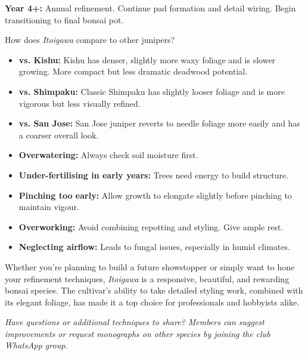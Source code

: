 \textbf{Year 4+:} Annual refinement.
Continue pad formation and detail wiring.
Begin transitioning to final bonsai pot.

\medskip
{}
\noindent
How does \textit{Itoigawa} compare to other junipers?

\begin{itemize}
    \item \textbf{vs. Kishu:} Kishu has denser, slightly more waxy foliage and is slower growing.
    More compact but less dramatic deadwood potential.

    \item \textbf{vs. Shimpaku:} Classic Shimpaku has slightly looser foliage and is more vigorous but less visually refined.

    \item \textbf{vs. San Jose:} San Jose juniper reverts to needle foliage more easily and has a coarser overall look.
\end{itemize}

\medskip
{}
\noindent
\begin{itemize}
    \item \textbf{Overwatering:} Always check soil moisture first.

    \item \textbf{Under\--fertilising in early years:} Trees need energy to build structure.

    \item \textbf{Pinching too early:} Allow growth to elongate slightly before pinching to maintain vigour.

    \item \textbf{Overworking:} Avoid combining repotting and styling.
    Give ample rest.

    \item \textbf{Neglecting airflow:} Leads to fungal issues, especially in humid climates.
\end{itemize}

\medskip
{}
\noindent
Whether you're planning to build a future showstopper or simply want to hone your refinement techniques, \textit{Itoigawa} is a responsive, beautiful, and rewarding bonsai species.
The cultivar's ability to take detailed styling work, combined with its elegant foliage, has made it a top choice for professionals and hobbyists alike.

\textit{Have questions or additional techniques to share? Members can suggest improvements or request monographs on other species by joining the club WhatsApp group.}
\closearticle
\clearpage
